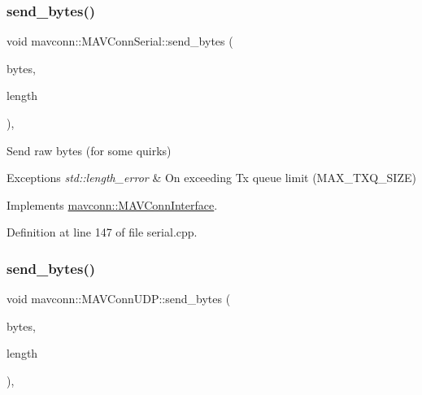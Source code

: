 \mbox{\label{group__mavconn_ga6073d6f88157f3b29ee519eafe16f8fd}} 
\subsubsection{\texorpdfstring{send\_bytes()}{send\_bytes()}\hspace{0.1cm}{\footnotesize\ttfamily [1/5]}}
{\footnotesize\ttfamily void mavconn\+::\+M\+A\+V\+Conn\+Serial\+::send\+\_\+bytes (\begin{DoxyParamCaption}\item[{const uint8\+\_\+t $\ast$}]{bytes,  }\item[{size\+\_\+t}]{length }\end{DoxyParamCaption})\hspace{0.3cm}{\ttfamily [override]}, {\ttfamily [virtual]}}



Send raw bytes (for some quirks) 


\begin{DoxyExceptions}{Exceptions}
{\em std\+::length\+\_\+error} & On exceeding Tx queue limit (M\+A\+X\+\_\+\+T\+X\+Q\+\_\+\+S\+I\+ZE) \\
\hline
\end{DoxyExceptions}


Implements \mbox{\hyperlink{group__mavconn_ga7d00279e176e9a6890ed47ab1ceeb597}{mavconn\+::\+M\+A\+V\+Conn\+Interface}}.



Definition at line 147 of file serial.\+cpp.

\mbox{\label{group__mavconn_ga7a1a56365cb5355da86a6a6e2bb4bc8e}} 
\subsubsection{\texorpdfstring{send\_bytes()}{send\_bytes()}\hspace{0.1cm}{\footnotesize\ttfamily [2/5]}}
{\footnotesize\ttfamily void mavconn\+::\+M\+A\+V\+Conn\+U\+D\+P\+::send\+\_\+bytes (\begin{DoxyParamCaption}\item[{const uint8\+\_\+t $\ast$}]{bytes,  }\item[{size\+\_\+t}]{length }\end{DoxyParamCaption})\hspace{0.3cm}{\ttfamily [override]}, {\ttfamily [virtual]}}



